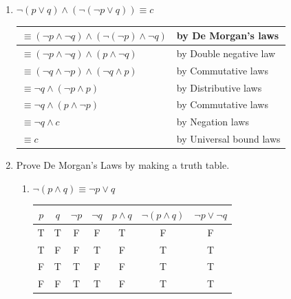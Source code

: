 \documentclass[letterpaper]{article}
\begin{document}
\begin{enumerate}
        \textbf{Tautology}

        \item $\neg (p \lor q)\land (\neg (\neg p \lor q)) \equiv c$

        
        \begin{tabular}{|l|l|}
            \hline
            $\equiv (\neg p \land \neg q)\land(\neg(\neg p)\land \neg q)$ & by De Morgan’s laws \\ \hline
            $\equiv (\neg p \land \neg q)\land(p \land \neg q)$ & by Double negative law \\ \hline
            $\equiv (\neg q \land \neg p) \land (\neg q \land p)$ & by Commutative laws \\ \hline
            $\equiv \neg q \land (\neg p \land p)$ & by Distributive laws \\ \hline
            $\equiv \neg q \land (p \land \neg p)$ & by Commutative laws \\ \hline
            $\equiv \neg q \land c$ & by Negation laws \\ \hline
            $\equiv c$ & by Universal bound laws \\ \hline
        \end{tabular}
        
        \item Prove De Morgan's Laws by making a truth table.
        
        \begin{enumerate}
            \item $\neg (p \land q)\equiv \neg p \lor q$

            \begin{tabular}{|c|c|c|c|c|c|c|}
                \hline
                $p$ & $q$ & $\neg p$ & $\neg q$ & $p \land q$ & $\neg(p \land q)$ & $\neg p \lor \neg q$ \\ \hline
                T & T & F & F &  T&  F&  F\\ \hline
                T & F & F & T &  F&  T&  T\\ \hline
                F & T & T & F &  F&  T&  T\\ \hline
                F & F & T & T &  F&  T&  T\\ \hline
            \end{tabular}
            

\end{enumerate}
\end{enumerate}
\end{document}
